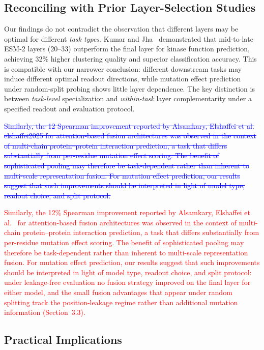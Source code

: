 \documentclass[11pt,a4paper]{article}
\begin{document}
\subsection{Reconciling with Prior Layer-Selection Studies}

Our findings do not contradict the observation that different layers may be
optimal for different \emph{task types}. Kumar and Jha~\cite{kumar2025}
demonstrated that mid-to-late ESM-2 layers (20--33) outperform the final layer
for kinase function prediction, achieving 32\% higher clustering quality and
superior classification accuracy. This is compatible with our narrower conclusion:
different downstream tasks may induce different optimal readout directions, while
mutation effect prediction under random-split probing shows little layer dependence.
The key distinction is between \emph{task-level} specialization and
\emph{within-task} layer complementarity under a specified readout and evaluation
protocol.

\textcolor{blue}{\sout{Similarly, the 12 Spearman improvement reported by Alsamkary, Elshaffei
et al. elshaffei2025 for attention-based fusion architectures was
observed in the context of multi-chain protein--protein interaction prediction,
a task that differs substantially from per-residue mutation effect scoring.
The benefit of sophisticated pooling may therefore be task-dependent rather than
inherent to multi-scale representation fusion. For mutation effect prediction,
our results suggest that such improvements should be interpreted in light of
model type, readout choice, and split protocol.}}

\textcolor{red}{Similarly, the 12\% Spearman improvement reported by Alsamkary, Elshaffei
et al.~\cite{elshaffei2025} for attention-based fusion architectures was
observed in the context of multi-chain protein--protein interaction prediction,
a task that differs substantially from per-residue mutation effect scoring.
The benefit of sophisticated pooling may therefore be task-dependent rather than
inherent to multi-scale representation fusion. For mutation effect prediction,
our results suggest that such improvements should be interpreted in light of
model type, readout choice, and split protocol: under leakage-free evaluation
no fusion strategy improved on the final layer for either model, and the
small fusion advantages that appear under random splitting track the
position-leakage regime rather than additional mutation information
(Section~3.3).}

\subsection{Practical Implications}
\end{document}
